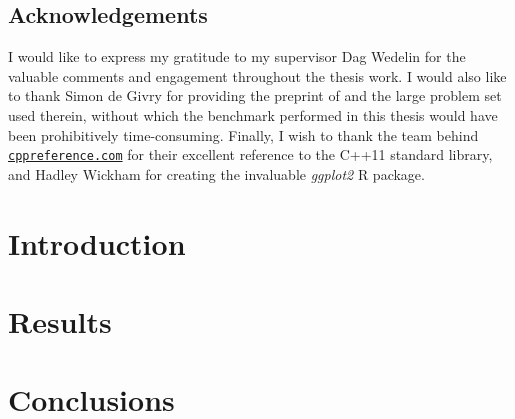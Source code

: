 \documentclass[paper=A4,DIV=calc]{scrbook}
\theoremstyle{plain}
\theoremstyle{definition}
\begin{document}
	\frontmatter
	\makefrontmatter[style=grid,legal-text]

	\cleardoublepage
	\section*{Acknowledgements}
	I would like to express my gratitude to my supervisor Dag Wedelin for the valuable comments and engagement throughout the thesis work.
	I would also like to thank Simon de Givry for providing the preprint of  \parencite{deGivry14} and the large problem set used therein, without which the benchmark performed in this thesis would have been prohibitively time-consuming.
	Finally, I wish to thank the team behind \href{http://en.cppreference.com/w/}{\nolinkurl{cppreference.com}} for their excellent reference to the C++11 standard library, and Hadley Wickham for creating the invaluable \textit{\textsf{ggplot2}} R package.

	\cleardoublepage
	\tableofcontents
	\cleardoublepage
	\printglossary[type=\acronymtype,]

	\mainmatter

	\chapter{Introduction}
	
	
	

	\glsresetall

	
	

	
	

	\chapter{Results}
	
	
	
	

	\chapter{Conclusions}
	

	\printbibliography[heading=bibintoc]
	\backmatter
\end{document}
